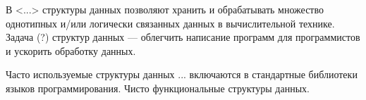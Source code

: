\startprefacepage

В <...> структуры данных позволяют хранить и обрабатывать множество однотипных 
и/или логически связанных данных в вычислительной технике.
Задача (?) структур данных — облегчить написание программ для программистов и
ускорить обработку данных.

Часто используемые структуры данных ... включаются в стандартные библиотеки
языков программирования.
Чисто функциональные структуры данных.


